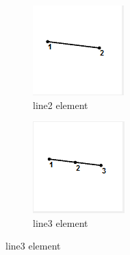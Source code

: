 \begin{figure}[!h]
\centering
\begin{subfigure}{.5\textwidth}
  \centering
  \includegraphics[width=0.3\linewidth]{../Graphics/LISA-line2.png}
  \caption{line2 element}
  \label{fig:sub1}
\end{subfigure}%
\begin{subfigure}{.5\textwidth}
  \centering
  \includegraphics[width=0.3\linewidth]{../Graphics/LISA-line3.png}
  \caption{line3 element}
  \label{fig:sub2}
\end{subfigure}
\label{fig:test}
\end{figure}






